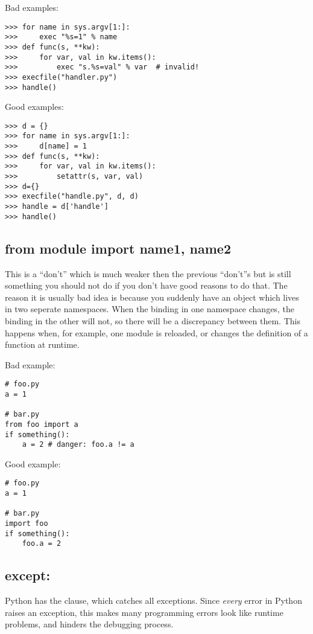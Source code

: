 \documentclass{howto}
\begin{document}
Bad examples:

\begin{verbatim}
>>> for name in sys.argv[1:]:
>>>     exec "%s=1" % name
>>> def func(s, **kw):
>>>     for var, val in kw.items():
>>>         exec "s.%s=val" % var  # invalid!
>>> execfile("handler.py")
>>> handle()
\end{verbatim}

Good examples:

\begin{verbatim}
>>> d = {}
>>> for name in sys.argv[1:]:
>>>     d[name] = 1
>>> def func(s, **kw):
>>>     for var, val in kw.items():
>>>         setattr(s, var, val)
>>> d={}
>>> execfile("handle.py", d, d)
>>> handle = d['handle']
>>> handle()
\end{verbatim}

\subsection{from module import name1, name2}

This is a ``don't'' which is much weaker then the previous ``don't''s
but is still something you should not do if you don't have good reasons
to do that. The reason it is usually bad idea is because you suddenly
have an object which lives in two seperate namespaces. When the binding
in one namespace changes, the binding in the other will not, so there
will be a discrepancy between them. This happens when, for example,
one module is reloaded, or changes the definition of a function at runtime. 

Bad example:

\begin{verbatim}
# foo.py
a = 1

# bar.py
from foo import a
if something():
    a = 2 # danger: foo.a != a 
\end{verbatim}

Good example:

\begin{verbatim}
# foo.py
a = 1

# bar.py
import foo
if something():
    foo.a = 2
\end{verbatim}

\subsection{except:}

Python has the  clause, which catches all exceptions.
Since {\em every} error in Python raises an exception, this makes many
programming errors look like runtime problems, and hinders
the debugging process.
\end{document}
